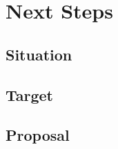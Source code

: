 {\let\cleardoublepage\relax \chapter*{Next Steps}}

\section{Situation}

\section{Target}

\section{Proposal}

